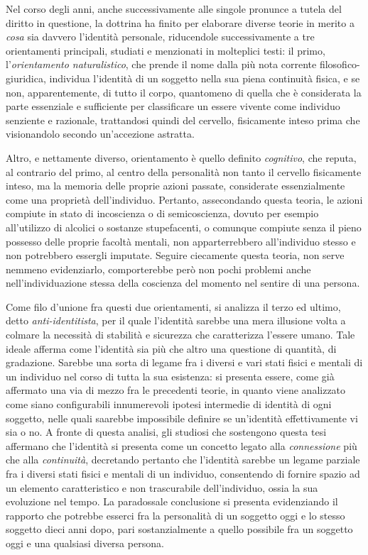 Nel corso degli anni, anche successivamente alle singole pronunce a tutela del diritto in questione, la dottrina ha finito per elaborare diverse teorie in merito a \textit{cosa} sia davvero l'identità personale, riducendole successivamente a tre orientamenti principali, studiati e menzionati in molteplici testi: il primo, l'\textit{orientamento naturalistico}, che prende il nome dalla più nota corrente filosofico-giuridica, individua l'identità di un soggetto nella sua piena continuità fisica, e se non, apparentemente, di tutto il corpo, quantomeno di quella che è considerata la parte essenziale e sufficiente per classificare un essere vivente come individuo senziente e razionale, trattandosi quindi del cervello, fisicamente inteso prima che visionandolo secondo un'accezione astratta.

Altro, e nettamente diverso, orientamento è quello definito \textit{cognitivo}, che reputa, al contrario del primo, al centro della personalità non tanto il cervello fisicamente inteso, ma la memoria delle proprie azioni passate, considerate essenzialmente come una proprietà dell'individuo. Pertanto, assecondando questa teoria, le azioni compiute in stato di incoscienza o di semicoscienza, dovuto per esempio all'utilizzo di alcolici o sostanze stupefacenti, o comunque compiute senza il pieno possesso delle proprie facoltà mentali, non apparterrebbero all'individuo stesso e non potrebbero essergli imputate. Seguire ciecamente questa teoria, non serve nemmeno evidenziarlo, comporterebbe però non pochi problemi anche nell'individuazione stessa della coscienza del momento nel sentire di una persona. 

Come filo d'unione fra questi due orientamenti, si analizza il terzo ed ultimo, detto \textit{anti-identitista}, per il quale l'identità sarebbe una mera illusione volta a colmare la necessità di stabilità e sicurezza che caratterizza l'essere umano. Tale ideale afferma come l'identità sia più che altro una questione di quantità, di gradazione. Sarebbe una sorta di legame fra i diversi e vari stati fisici e mentali di un individuo nel corso di tutta la sua esistenza: si presenta essere, come già affermato una via di mezzo fra le precedenti teorie, in quanto viene analizzato come siano configurabili innumerevoli ipotesi intermedie di identità di ogni soggetto, nelle quali saarebbe impossibile definire se un’identità effettivamente vi sia o no. A fronte di questa analisi, gli studiosi che sostengono questa tesi affermano  che l'identità si presenta come un concetto legato alla \textit{connessione} più che alla \textit{continuità}, decretando pertanto che l’identità sarebbe un legame parziale fra i diversi stati fisici e mentali di un individuo, consentendo di fornire spazio ad un elemento caratteristico e non trascurabile dell'individuo, ossia la sua evoluzione nel tempo. La paradossale conclusione si presenta evidenziando il rapporto che potrebbe esserci fra la personalità di un soggetto oggi e lo stesso soggetto dieci anni dopo, pari sostanzialmente a quello possibile fra un soggetto oggi e una qualsiasi diversa persona.

